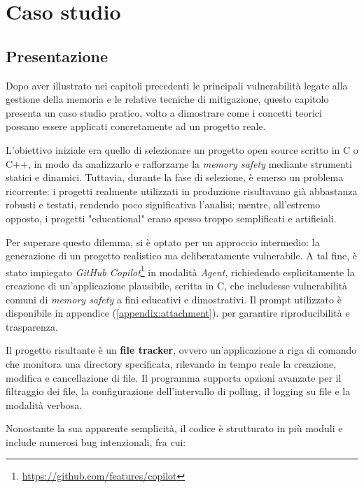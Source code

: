 \chapter{Caso studio}
\label{chap:real_case}

\section{Presentazione}
\label{sec:presentation}

Dopo aver illustrato nei capitoli precedenti le principali vulnerabilità legate alla
gestione della memoria e le relative tecniche di mitigazione, questo capitolo
presenta un caso studio pratico, volto a dimostrare come i concetti teorici possano
essere applicati concretamente ad un progetto reale.

L'obiettivo iniziale era quello di selezionare un progetto open source scritto in
C o C++, in modo da analizzarlo e rafforzarne la \textit{memory safety} mediante
strumenti statici e dinamici. Tuttavia, durante la fase di selezione, è emerso
un problema ricorrente: i progetti realmente utilizzati in produzione risultavano
già abbastanza robusti e testati, rendendo poco significativa l'analisi; mentre,
all'estremo opposto, i progetti "educational" erano spesso troppo semplificati e
artificiali.

Per superare questo dilemma, si è optato per un approccio intermedio: la generazione
di un progetto realistico ma deliberatamente vulnerabile. A tal fine, è stato impiegato
\textit{GitHub Copilot}\footnote{\url{https://github.com/features/copilot}} in modalità
\textit{Agent}, richiedendo esplicitamente la creazione di un'applicazione plausibile,
scritta in C, che includesse vulnerabilità comuni di \textit{memory safety} a
fini educativi e dimostrativi. Il prompt utilizzato è disponibile in appendice (\autoref{appendix:attachment}).
per garantire riproducibilità e trasparenza.

Il progetto risultante è un \textbf{file tracker}, ovvero un'applicazione a riga
di comando che monitora una directory specificata, rilevando in tempo reale la creazione,
modifica e cancellazione di file. Il programma supporta opzioni avanzate per il filtraggio
dei file, la configurazione dell'intervallo di polling, il logging su file e la modalità
verbosa.

Nonostante la sua apparente semplicità, il codice è strutturato in più moduli e
include numerosi bug intenzionali, fra cui:

